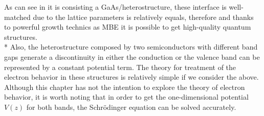 As can see in  it is consisting a GaAs/\algaas heterostructure, these interface is well-matched due to the lattice parameters is relatively equals, therefore and thanks to powerful growth technics as MBE it is possible to get high-quality quantum structures. \\*
Also, the heterostructure composed by two semiconductors with different band gaps generate a discontinuity in either the conduction or the valence band can be represented by a constant potential term\cite{harrison2016quantum}.  The theory for treatment of the electron behavior in these structures is relatively simple if we consider the above. 
Although this chapter has not the intention to explore the theory of electron behavior, it is worth noting that in order to get the one-dimensional potential $V(z)$ for both bands,  the Schr\"odinger equation can be solved accurately. 

